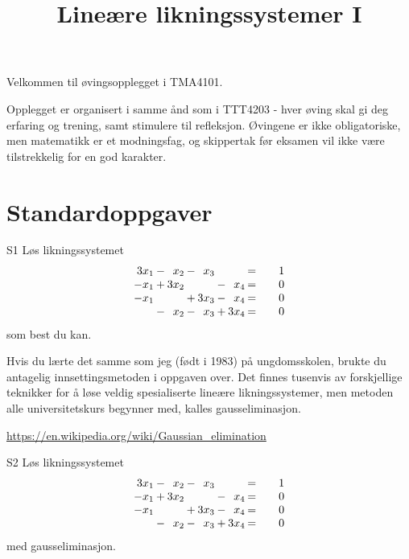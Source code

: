 

\title{Lineære likningssystemer I}





\maketitle

Velkommen til øvingsopplegget i TMA4101. 

Opplegget er organisert i samme ånd som i TTT4203 - hver øving skal gi deg erfaring og trening, 
samt stimulere til refleksjon. 
Øvingene er ikke obligatoriske, 
men matematikk er et modningsfag, 
og skippertak før eksamen vil ikke være tilstrekkelig for en god karakter.



\section*{Standardoppgaver}




\begin{oppgave}{S1}
Løs likningssystemet
\[
\setlength\arraycolsep{1pt}
\begin{array}{rcrcrcrc@{\qquad}l}
3x_1  &  - &   x_2    & - &   x_3   &  &      &   =   &  1  \\
-x_1 & + &   3x_2   &  &     & - &   x_4   &   =   &  0 \\
-x_1 &    &        & +  &   3x_3  &  - &   x_4   &  =   &   0\\
   &  - &   x_2   &  - &    x_3   &  + &   3x_4   &  =   &  0 
\end{array}
\]
som best du kan.
\end{oppgave}

Hvis du lærte det samme som jeg (født i 1983) på ungdomsskolen,
brukte du antagelig innsettingsmetoden i oppgaven over.
Det finnes tusenvis av forskjellige teknikker for å løse veldig spesialiserte lineære likningssystemer, 
men metoden alle universitetskurs begynner med, 
kalles gausseliminasjon.

\url{https://en.wikipedia.org/wiki/Gaussian_elimination}



\begin{oppgave}{S2}
Løs likningssystemet
\[
\setlength\arraycolsep{1pt}
\begin{array}{rcrcrcrc@{\qquad}l}
3x_1  &  - &   x_2    & - &   x_3   &  &      &   =   &  1  \\
-x_1 & + &   3x_2   &  &     & - &   x_4   &   =   &  0 \\
-x_1 &    &        & + &   3x_3  &  - &   x_4   &  =   &   0\\
   &  - &   x_2   &  - &    x_3   &  + &   3x_4   &  =   &  0 
\end{array}
\]
med gausseliminasjon.
\end{oppgave}

